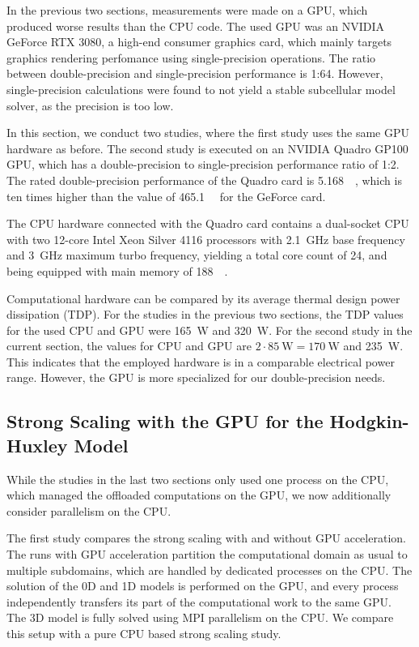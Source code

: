 In the previous two sections, measurements were made on a GPU, which produced worse results than the CPU code. The used GPU was an NVIDIA GeForce RTX 3080, a high-end consumer graphics card, which mainly targets graphics rendering perfomance using single-precision operations. The ratio between double-precision and single-precision performance is 1:64. However, single-precision calculations were found to not yield a stable subcellular model solver, as the precision is too low. 

In this section, we conduct two studies, where the first study uses the same GPU hardware as before. The second study is executed on an NVIDIA Quadro GP100 GPU, which has a double-precision to single-precision performance ratio of 1:2.
The rated double-precision performance of the Quadro card is \SI{5.168}{\tera\flops}, which is ten times higher than the value of \SI{465.1}{\giga\flops} for the GeForce card. 

The CPU hardware connected with the Quadro card contains a dual-socket CPU with two 12-core Intel Xeon Silver 4116 processors with \SI{2.1}{\giga\hertz} base frequency and \SI{3}{\giga\hertz} maximum turbo frequency, yielding a total core count of 24, and being equipped with main memory of \SI{188}{\gibi\byte}. 

Computational hardware can be compared by its average thermal design power dissipation (TDP). For the studies in the previous two sections, the TDP values for the used CPU and GPU were \SI{165}{\watt} and \SI{320}{\watt}. For the second study in the current section, the values for CPU and GPU are $2\cdot \SI{85}{\watt} = \SI{170}{\watt}$ and \SI{235}{\watt}. This indicates that the employed hardware is in a comparable electrical power range. However, the GPU is more specialized for our double-precision needs.

\subsection{Strong Scaling with the GPU for the Hodgkin-Huxley Model}\label{sec:strong_scaling_gpu_hodgkin_huxley}

While the studies in the last two sections only used one process on the CPU, which managed the offloaded computations on the GPU,
we now additionally consider parallelism on the CPU.

The first study compares the strong scaling with and without GPU acceleration. The runs with GPU acceleration partition the computational domain as usual to multiple subdomains, which are handled by dedicated processes on the CPU. The solution of the 0D and 1D models is performed on the GPU, and every process independently transfers its part of the computational work to the same GPU. The 3D model is fully solved using MPI parallelism on the CPU. We compare this setup with a pure CPU based strong scaling study.

